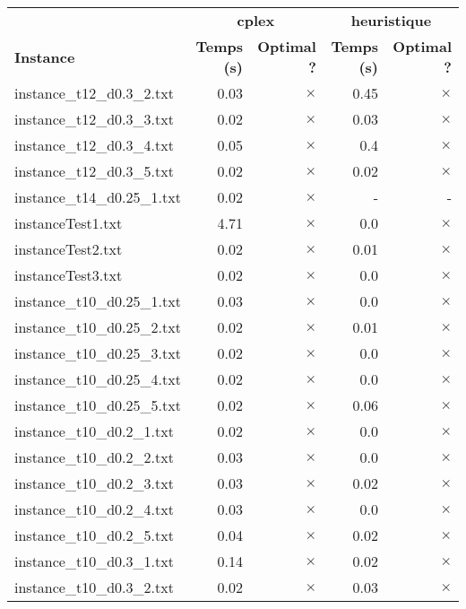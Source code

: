 \documentclass{article}
\begin{document}
\newpage
\begin{center}
\renewcommand{\arraystretch}{1.4} 
 \begin{tabular}{lrrrr}
	\hline
 & \multicolumn{2}{c}{\textbf{cplex}} & \multicolumn{2}{c}{\textbf{heuristique}}\\
\textbf{Instance}  & \textbf{Temps (s)} & \textbf{Optimal ?}  & \textbf{Temps (s)} & \textbf{Optimal ?} \\\hline

instance\_t12\_d0.3\_2.txt & 0.03 & 
$\times$
 & 0.45 & 
$\times$
\\
instance\_t12\_d0.3\_3.txt & 0.02 & 
$\times$
 & 0.03 & 
$\times$
\\
instance\_t12\_d0.3\_4.txt & 0.05 & 
$\times$
 & 0.4 & 
$\times$
\\
instance\_t12\_d0.3\_5.txt & 0.02 & 
$\times$
 & 0.02 & 
$\times$
\\
instance\_t14\_d0.25\_1.txt & 0.02 & 
$\times$
 & - & - 
\\
instanceTest1.txt & 4.71 & 
$\times$
 & 0.0 & 
$\times$
\\
instanceTest2.txt & 0.02 & 
$\times$
 & 0.01 & 
$\times$
\\
instanceTest3.txt & 0.02 & 
$\times$
 & 0.0 & 
$\times$
\\
instance\_t10\_d0.25\_1.txt & 0.03 & 
$\times$
 & 0.0 & 
$\times$
\\
instance\_t10\_d0.25\_2.txt & 0.02 & 
$\times$
 & 0.01 & 
$\times$
\\
instance\_t10\_d0.25\_3.txt & 0.02 & 
$\times$
 & 0.0 & 
$\times$
\\
instance\_t10\_d0.25\_4.txt & 0.02 & 
$\times$
 & 0.0 & 
$\times$
\\
instance\_t10\_d0.25\_5.txt & 0.02 & 
$\times$
 & 0.06 & 
$\times$
\\
instance\_t10\_d0.2\_1.txt & 0.02 & 
$\times$
 & 0.0 & 
$\times$
\\
instance\_t10\_d0.2\_2.txt & 0.03 & 
$\times$
 & 0.0 & 
$\times$
\\
instance\_t10\_d0.2\_3.txt & 0.03 & 
$\times$
 & 0.02 & 
$\times$
\\
instance\_t10\_d0.2\_4.txt & 0.03 & 
$\times$
 & 0.0 & 
$\times$
\\
instance\_t10\_d0.2\_5.txt & 0.04 & 
$\times$
 & 0.02 & 
$\times$
\\
instance\_t10\_d0.3\_1.txt & 0.14 & 
$\times$
 & 0.02 & 
$\times$
\\
instance\_t10\_d0.3\_2.txt & 0.02 & 
$\times$
 & 0.03 & 
$\times$
\\

\end{tabular}
\end{center}
\end{document}

